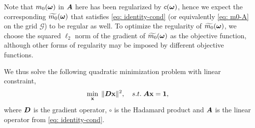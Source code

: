 Note that $m_0(\boldsymbol{\omega})$ in $\boldsymbol{A}$ here has been regularized by $c(\boldsymbol{\omega})$, hence we expect the corresponding $\widetilde{m_{0}}(\boldsymbol{\omega})$ that satisfies \eqref{eq: identity-cond} (or equivalently \eqref{eq: m0-A} on the grid $\mathcal{G}$) to be regular as well. To optimize the regularity of $\widetilde{m_{0}}(\boldsymbol{\omega})$,  we choose the squared $\ell_2$ norm of the gradient of $\widetilde{m_{0}}(\boldsymbol{\omega})$ as the objective function, although other forms of regularity may be imposed by different objective functions.

We thus solve the following quadratic minimization problem with linear constraint,
\begin{align}\label{eq: opt}
\min_{\mathbf{x}}\; \Vert \boldsymbol{D}\mathbf{x}\Vert^2,\quad 
s.t. \; \boldsymbol{A}\mathbf{x} = \mathbf{1},
\end{align}
where $\boldsymbol{D}$ is the gradient operator, $\circ$ is the Hadamard product and $\boldsymbol{A}$ is the linear operator from \eqref{eq: identity-cond}. 

